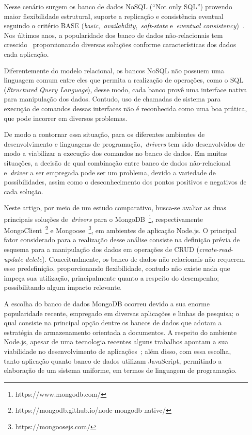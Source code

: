 \documentclass[12pt]{article}
\begin{document}
Nesse cenário surgem os banco de dados NoSQL (``Not only SQL'') provendo maior flexibilidade estrutural, suporte a replicação e consistência eventual seguindo o critério BASE (\textit{basic},~\textit{availability},~\textit{soft-state} e~\textit{eventual consistency})~\cite{han2011survey}. 
Nos últimos anos, a popularidade dos banco de dados não-relacionais tem crescido~\cite{cooper2010benchmarking,edlich2015nosql} proporcionando diversas soluções conforme características dos dados cada aplicação.

Diferentemente do modelo relacional, os bancos NoSQL não possuem uma linguagem comum entre eles que permita a realização de operações, como o SQL (\emph{Structured Query Language}), desse modo, cada banco provê uma interface nativa para manipulação dos dados. 
Contudo, uso de chamadas de sistema para execução de comandos dessas interfaces não é reconhecida como uma boa prática, que pode incorrer em diversos problemas. 

De modo a contornar essa situação, para os diferentes ambientes de desenvolvimento e linguagens de programação,~\emph{drivers} tem sido desenvolvidos de modo a viabilizar a execução dos comandos no banco de dados. 
Em muitas situações, a decisão de qual combinação entre banco de dados não-relacional e~\emph{driver} a ser empregada pode ser um problema, devido a variedade de possibilidades, assim como o desconhecimento dos pontos positivos e negativos de cada solução.

Neste artigo, por meio de um estudo comparativo, busca-se avaliar as duas principais soluções de~\emph{drivers} para o MongoDB~\footnote{https://www.mongodb.com/}, respectivamente MongoClient~\footnote{https://mongodb.github.io/node-mongodb-native/} e Mongoose~\footnote{https://mongoosejs.com/}, em ambientes de aplicação Node.js. 
O principal fator considerado para a realização desse análise consiste na definição prévia de esquema para a manipulação dos dados em operações de CRUD (\emph{create}-\emph{read}-\emph{update}-\emph{delete}). Conceitualmente, os banco de dados não-relacionais não requerem esse predefinição, proporcionando flexibilidade, contudo não existe nada que impeça sua utilização, principalmente quanto a respeito do desempenho; possibilitando algum impacto relevante.

A escolha do banco de dados MongoDB ocorreu devido a sua enorme popularidade recente, empregado em diversas aplicações e linhas de pesquisa; o qual consiste na principal opção dentre os bancos de dados que adotam a estratégia de armazenamento orientada a documentos.
A respeito do ambiente Node.js, apesar de uma tecnologia recentes alguns trabalhos apontam a sua viabilidade no desenvolvimento de aplicações~\cite{chaniotis2015node}; além disso, com essa escolha, tanto aplicação quanto banco de dados utilizam JavaScript, permitindo a elaboração de um sistema uniforme, em termos de linguagem de programação.
\end{document}
